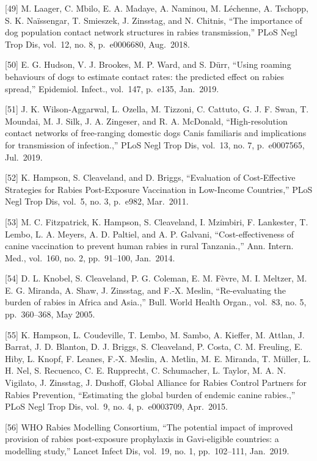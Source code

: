 \documentclass[
]{book}
\begin{document}
{[}49{]} M. Laager, C. Mbilo, E. A. Madaye, A. Naminou, M. Léchenne, A. Tschopp, S. K. Naïssengar, T. Smieszek, J. Zinsstag, and N. Chitnis, ``The importance of dog population contact network structures in rabies transmission,'' PLoS Negl Trop Dis, vol.~12, no. 8, p.~e0006680, Aug.~2018.

{[}50{]} E. G. Hudson, V. J. Brookes, M. P. Ward, and S. Dürr, ``Using roaming behaviours of dogs to estimate contact rates: the predicted effect on rabies spread,'' Epidemiol. Infect., vol.~147, p.~e135, Jan.~2019.

{[}51{]} J. K. Wilson-Aggarwal, L. Ozella, M. Tizzoni, C. Cattuto, G. J. F. Swan, T. Moundai, M. J. Silk, J. A. Zingeser, and R. A. McDonald, ``High-resolution contact networks of free-ranging domestic dogs Canis familiaris and implications for transmission of infection.,'' PLoS Negl Trop Dis, vol.~13, no. 7, p.~e0007565, Jul.~2019.

{[}52{]} K. Hampson, S. Cleaveland, and D. Briggs, ``Evaluation of Cost-Effective Strategies for Rabies Post-Exposure Vaccination in Low-Income Countries,'' PLoS Negl Trop Dis, vol.~5, no. 3, p.~e982, Mar.~2011.

{[}53{]} M. C. Fitzpatrick, K. Hampson, S. Cleaveland, I. Mzimbiri, F. Lankester, T. Lembo, L. A. Meyers, A. D. Paltiel, and A. P. Galvani, ``Cost-effectiveness of canine vaccination to prevent human rabies in rural Tanzania.,'' Ann. Intern. Med., vol.~160, no. 2, pp.~91--100, Jan.~2014.

{[}54{]} D. L. Knobel, S. Cleaveland, P. G. Coleman, E. M. Fèvre, M. I. Meltzer, M. E. G. Miranda, A. Shaw, J. Zinsstag, and F.-X. Meslin, ``Re-evaluating the burden of rabies in Africa and Asia.,'' Bull. World Health Organ., vol.~83, no. 5, pp.~360--368, May 2005.

{[}55{]} K. Hampson, L. Coudeville, T. Lembo, M. Sambo, A. Kieffer, M. Attlan, J. Barrat, J. D. Blanton, D. J. Briggs, S. Cleaveland, P. Costa, C. M. Freuling, E. Hiby, L. Knopf, F. Leanes, F.-X. Meslin, A. Metlin, M. E. Miranda, T. Müller, L. H. Nel, S. Recuenco, C. E. Rupprecht, C. Schumacher, L. Taylor, M. A. N. Vigilato, J. Zinsstag, J. Dushoff, Global Alliance for Rabies Control Partners for Rabies Prevention, ``Estimating the global burden of endemic canine rabies.,'' PLoS Negl Trop Dis, vol.~9, no. 4, p.~e0003709, Apr.~2015.

{[}56{]} WHO Rabies Modelling Consortium, ``The potential impact of improved provision of rabies post-exposure prophylaxis in Gavi-eligible countries: a modelling study,'' Lancet Infect Dis, vol.~19, no. 1, pp.~102--111, Jan.~2019.
\end{document}
